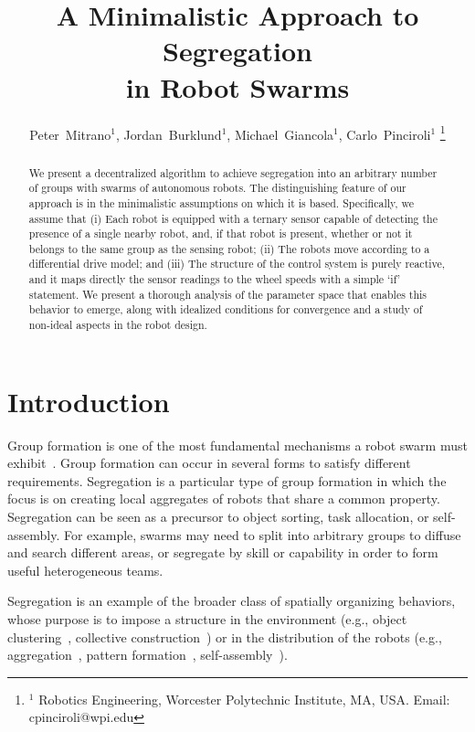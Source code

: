 \documentclass[letterpaper, 10 pt, conference]{ieeeconf}
\begin{document}
\title{\LARGE \bf
A Minimalistic Approach to Segregation\\
in Robot Swarms}

\author{
  Peter~Mitrano$^{1}$,
  Jordan~Burklund$^{1}$,
  Michael~Giancola$^{1}$,
  Carlo~Pinciroli$^{1}$%
  \thanks{$^{1}$ Robotics Engineering, Worcester Polytechnic Institute, MA, USA. Email: {\sf cpinciroli@wpi.edu}}%
}

\maketitle
\thispagestyle{empty}
\pagestyle{empty}

\begin{abstract}
  We present a decentralized algorithm to achieve segregation into an arbitrary
  number of groups with swarms of autonomous robots. The distinguishing feature
  of our approach is in the minimalistic assumptions on which it is
  based. Specifically, we assume that (i) Each robot is equipped with a ternary
  sensor capable of detecting the presence of a single nearby robot, and, if
  that robot is present, whether or not it belongs to the same group as the
  sensing robot; (ii) The robots move according to a differential drive model;
  and (iii) The structure of the control system is purely reactive, and it maps
  directly the sensor readings to the wheel speeds with a simple `if' statement.
  We present a thorough analysis of the parameter space
  that enables this behavior to emerge, along with idealized conditions for
  convergence and a study of non-ideal aspects in the robot design.
\end{abstract}

\section{Introduction}

Group formation is one of the most fundamental mechanisms a robot swarm must
exhibit~\cite{Brambilla2013}. Group formation can occur in several forms to
satisfy different requirements. Segregation is a particular type of group
formation in which the focus is on creating local aggregates of robots that
share a common property. Segregation can be seen as a precursor to object
sorting, task allocation, or self-assembly. For example, swarms may need to
split into arbitrary groups to diffuse and search different areas, or segregate
by skill or capability in order to form useful heterogeneous teams.

Segregation is an example of the broader class of spatially organizing
behaviors, whose purpose is to impose a structure in the environment (e.g.,
object clustering~\cite{gauci_clustering_2014}, collective
construction~\cite{Bolger2010}) or in the distribution of the robots (e.g.,
aggregation~\cite{shlyakhov_survey_2017}, pattern
formation~\cite{Pinciroli:DARS2016}, self-assembly~\cite{gross2008self}).
\end{document}

